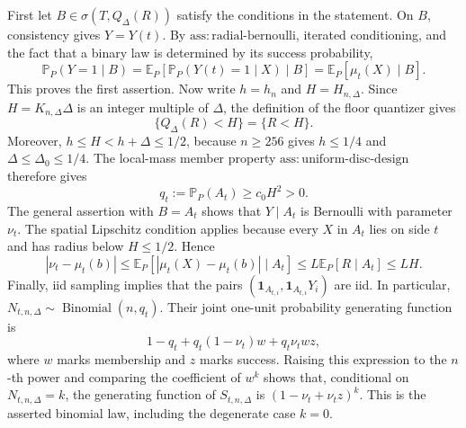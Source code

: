 First let \(B\in\sigma(T,Q_\Delta(R))\) satisfy the conditions in the statement.  On \(B\), consistency gives \(Y=Y(t)\).  By \(\mathrm{ass:radial\text{-}bernoulli}\), iterated conditioning, and the fact that a binary law is determined by its success probability,
\[
 \mathbb P_P(Y=1\mid B)
 =\mathbb E_P[\mathbb P_P(Y(t)=1\mid X)\mid B]
 =\mathbb E_P[\mu_t(X)\mid B].
\]
This proves the first assertion.  Now write \(h=h_n\) and \(H=H_{n,\Delta}\).  Since \(H=K_{n,\Delta}\Delta\) is an integer multiple of \(\Delta\), the definition of the floor quantizer gives
\[
 \{Q_\Delta(R)<H\}=\{R<H\}.
\]
Moreover, \(h\leq H<h+\Delta\leq1/2\), because \(n\geq256\) gives \(h\leq1/4\) and \(\Delta\leq\Delta_0\leq1/4\).  The local-mass member property \(\mathrm{ass:uniform\text{-}disc\text{-}design}\) therefore gives
\[
 q_t:=\mathbb P_P(A_t)\geq c_0H^2>0.
\]
The general assertion with \(B=A_t\) shows that \(Y\mid A_t\) is Bernoulli with parameter \(\nu_t\).  The spatial Lipschitz condition applies because every \(X\) in \(A_t\) lies on side \(t\) and has radius below \(H\leq1/2\).  Hence
\[
 |\nu_t-\mu_t(b)|
 \leq\mathbb E_P[|\mu_t(X)-\mu_t(b)|\mid A_t]
 \leq L\mathbb E_P[R\mid A_t]
 \leq LH.
\]
Finally, iid sampling implies that the pairs \((\mathbf1_{A_{t,i}},\mathbf1_{A_{t,i}}Y_i)\) are iid.  In particular, \(N_{t,n,\Delta}\sim\operatorname{Binomial}(n,q_t)\).  Their joint one-unit probability generating function is
\[
 1-q_t+q_t(1-\nu_t)w+q_t\nu_t wz,
\]
where \(w\) marks membership and \(z\) marks success.  Raising this expression to the \(n\)-th power and comparing the coefficient of \(w^k\) shows that, conditional on \(N_{t,n,\Delta}=k\), the generating function of \(S_{t,n,\Delta}\) is \((1-\nu_t+\nu_t z)^k\).  This is the asserted binomial law, including the degenerate case \(k=0\).